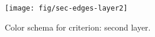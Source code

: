 \begin{figure}[!ht]
\begin{center}
\texttt{[image: fig/sec-edges-layer2]}
\caption{\label{fig:sec-edges-2} Color schema for
 criterion: second layer.}
\end{center}
\end{figure}
